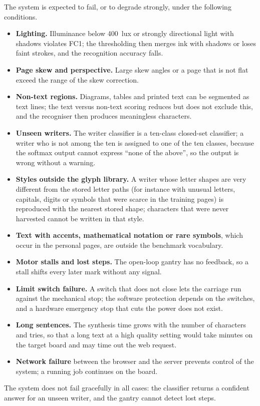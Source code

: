         The system is expected to fail, or to degrade strongly, under the following conditions.
        \begin{itemize}
          \item \textbf{Lighting.} Illuminance below 400~lux or strongly directional light with shadows violates FC1; the thresholding then merges ink with shadows or loses faint strokes, and the recognition accuracy falls.
          \item \textbf{Page skew and perspective.} Large skew angles or a page that is not flat exceed the range of the skew correction.
          \item \textbf{Non-text regions.} Diagrams, tables and printed text can be segmented as text lines; the text versus non-text scoring reduces but does not exclude this, and the recogniser then produces meaningless characters.
          \item \textbf{Unseen writers.} The writer classifier is a ten-class closed-set classifier; a writer who is not among the ten is assigned to one of the ten classes, because the softmax output cannot express ``none of the above'', so the output is wrong without a warning.
          \item \textbf{Styles outside the glyph library.} A writer whose letter shapes are very different from the stored letter paths (for instance with unusual letters, capitals, digits or symbols that were scarce in the training pages) is reproduced with the nearest stored shape; characters that were never harvested cannot be written in that style.
          \item \textbf{Text with accents, mathematical notation or rare symbols}, which occur in the personal pages, are outside the benchmark vocabulary.
          \item \textbf{Motor stalls and lost steps.} The open-loop gantry has no feedback, so a stall shifts every later mark without any signal.
          \item \textbf{Limit switch failure.} A switch that does not close lets the carriage run against the mechanical stop; the software protection depends on the switches, and a hardware emergency stop that cuts the power does not exist.
          \item \textbf{Long sentences.} The synthesis time grows with the number of characters and tries, so that a long text at a high quality setting would take minutes on the target board and may time out the web request.
          \item \textbf{Network failure} between the browser and the server prevents control of the system; a running job continues on the board.
        \end{itemize}
        The system does not fail gracefully in all cases: the classifier returns a confident answer for an unseen writer, and the gantry cannot detect lost steps.

